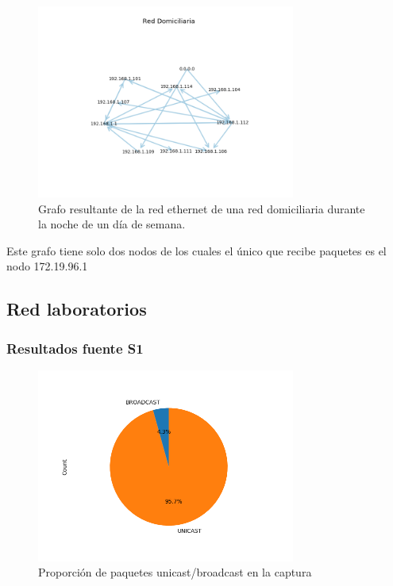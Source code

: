 \begin{figure}[H]
 \centering
	\includegraphics[width=8.5cm]{figs/red_domiciliaria.png}
	\caption{Grafo resultante de la red ethernet de una red domiciliaria durante la noche de un día de semana.}
	\label{fig:starbucks-grafo}
\end{figure}

Este grafo tiene solo dos nodos de los cuales el único que recibe paquetes es el nodo 172.19.96.1

\subsection*{Red laboratorios}

\subsubsection*{Resultados fuente S1}
\begin{figure}[H]
  \centering
  \includegraphics[width=8.5cm]{figs/broadcast_proportion_labo6_2018_04_18_S1_output.png}
  \caption{\normalfont Proporción de paquetes unicast/broadcast en la captura}
\end{figure}

